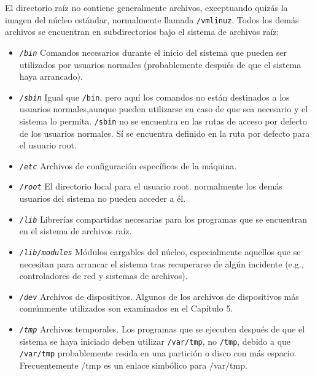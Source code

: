 El directorio raíz no contiene generalmente archivos, exceptuando quizás
la imagen del núcleo estándar, normalmente llamada
\texttt{/vmlinuz}.  Todos los demás archivos se encuentran en
subdirectorios bajo el sistema de archivos raíz:

\begin{itemize} 

	\item \textit{\texttt{/bin}}
	 Comandos necesarios durante el inicio del sistema que
	pueden ser utilizados por usuarios normales (probablemente después de
	que el sistema haya arrancado).  

	\item \textit{\texttt{/sbin}}
	 Igual que \texttt{/bin}, pero aquí los
	comandos 	no están destinados a los usuarios normales,aunque
	pueden utilizarse en caso de que sea necesario y el sistema lo permita.
	\texttt{/sbin} no se encuentra en las rutas de acceso por
	defecto de los usuarios normales. Sí se encuentra definido en la ruta
	por 		defecto para el usuario root.
	


	\item \textit{\texttt{/etc}}
	 Archivos de configuración específicos de la máquina.
	

	
	\item \textit{\texttt{/root}}
	 El directorio local para el usuario root.  normalmente
	los demás usuarios del sistema no pueden acceder a él.
	


	\item \textit{\texttt{/lib}}
	 Librerías compartidas necesarias para los programas que
	se encuentran en el sistema de archivos raíz.
	


	\item \textit{\texttt{/lib/modules}}
	 Módulos cargables del núcleo, especialmente
	aquellos que se necesitan para arrancar el sistema tras recuperarse
	de algún incidente (e.g., controladores de red y sistemas de
	archivos).


	\item \textit{\texttt{/dev}}
	 Archivos de dispositivos. Algunos de los archivos de
	dispositivos más comúnmente utilizados son examinados en el Capítulo 5.
	


	\item \textit{\texttt{/tmp}}
	 Archivos temporales. Los programas que se ejecuten
	después de que el sistema se haya iniciado deben utilizar
	\texttt{/var/tmp}, no \texttt{/tmp},
	debido a que \texttt{/var/tmp} probablemente resida en una
	partición o disco con más espacio. Frecuentemente /tmp es un enlace
	simbólico para /var/tmp.  



\end{itemize}
